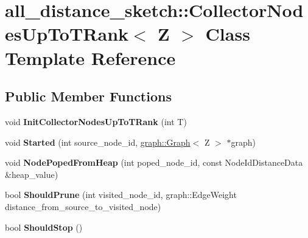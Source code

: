 \hypertarget{classall__distance__sketch_1_1CollectorNodesUpToTRank}{}\section{all\+\_\+distance\+\_\+sketch\+:\+:Collector\+Nodes\+Up\+To\+T\+Rank$<$ Z $>$ Class Template Reference}
\label{classall__distance__sketch_1_1CollectorNodesUpToTRank}
\subsection*{Public Member Functions}
\begin{DoxyCompactItemize}
\item 
\hypertarget{classall__distance__sketch_1_1CollectorNodesUpToTRank_a2192e662d8b37cfcd3d8da63f98170c3}{}void {\bfseries Init\+Collector\+Nodes\+Up\+To\+T\+Rank} (int T)\label{classall__distance__sketch_1_1CollectorNodesUpToTRank_a2192e662d8b37cfcd3d8da63f98170c3}

\item 
\hypertarget{classall__distance__sketch_1_1CollectorNodesUpToTRank_a6d1b22f773bfd3d8a588393b65cf7b7f}{}void {\bfseries Started} (int source\+\_\+node\+\_\+id, \hyperlink{classall__distance__sketch_1_1graph_1_1Graph}{graph\+::\+Graph}$<$ Z $>$ $\ast$graph)\label{classall__distance__sketch_1_1CollectorNodesUpToTRank_a6d1b22f773bfd3d8a588393b65cf7b7f}

\item 
\hypertarget{classall__distance__sketch_1_1CollectorNodesUpToTRank_a322fb2fe81b39d94e4f8de6efd655260}{}void {\bfseries Node\+Poped\+From\+Heap} (int poped\+\_\+node\+\_\+id, const Node\+Id\+Distance\+Data \&heap\+\_\+value)\label{classall__distance__sketch_1_1CollectorNodesUpToTRank_a322fb2fe81b39d94e4f8de6efd655260}

\item 
\hypertarget{classall__distance__sketch_1_1CollectorNodesUpToTRank_a93c82cd2b6558ac922fab6ee03e2133a}{}bool {\bfseries Should\+Prune} (int visited\+\_\+node\+\_\+id, graph\+::\+Edge\+Weight distance\+\_\+from\+\_\+source\+\_\+to\+\_\+visited\+\_\+node)\label{classall__distance__sketch_1_1CollectorNodesUpToTRank_a93c82cd2b6558ac922fab6ee03e2133a}

\item 
\hypertarget{classall__distance__sketch_1_1CollectorNodesUpToTRank_a30fcd3cfc3ca3372ce201cd7024521b3}{}bool {\bfseries Should\+Stop} ()\label{classall__distance__sketch_1_1CollectorNodesUpToTRank_a30fcd3cfc3ca3372ce201cd7024521b3}


\end{DoxyCompactItemize}
